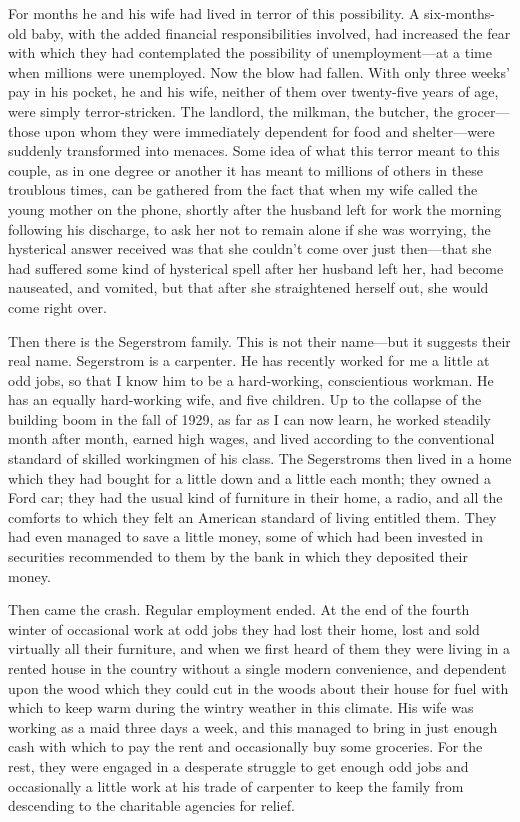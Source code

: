 \documentclass{book}
\begin{document}
For months he and his wife had lived in terror of this possibility. A six-months-old baby, with the added financial responsibilities involved, had increased the fear with which they had contemplated the possibility of unemployment—at a time when millions were unemployed. Now the blow had fallen. With only three weeks’ pay in his pocket, he and his wife, neither of them over twenty-five years of age, were simply terror-stricken. The landlord, the milkman, the butcher, the grocer—those upon whom they were immediately dependent for food and shelter—were suddenly transformed into menaces. Some idea of what this terror meant to this couple, as in one degree or another it has meant to millions of others in these troublous times, can be gathered from the fact that when my wife called the young mother on the phone, shortly after the husband left for work the morning following his discharge, to ask her not to remain alone if she was worrying, the hysterical answer received was that she couldn’t come over just then—that she had suffered some kind of hysterical spell after her husband left her, had become nauseated, and vomited, but that after she straightened herself out, she would come right over.

Then there is the Segerstrom family. This is not their name—but it suggests their real name. Segerstrom is a carpenter. He has recently worked for me a little at odd jobs, so that I know him to be a hard-working, conscientious workman. He has an equally hard-working wife, and five children. Up to the collapse of the building boom in the fall of 1929, as far as I can now learn, he worked steadily month after month, earned high wages, and lived according to the conventional standard of skilled workingmen of his class. The Segerstroms then lived in a home which they had bought for a little down and a little each month; they owned a Ford car; they had the usual kind of furniture in their home, a radio, and all the comforts to which they felt an American standard of living entitled them. They had even managed to save a little money, some of which had been invested in securities recommended to them by the bank in which they deposited their money.

Then came the crash. Regular employment ended. At the end of the fourth winter of occasional work at odd jobs they had lost their home, lost and sold virtually all their furniture, and when we first heard of them they were living in a rented house in the country without a single modern convenience, and dependent upon the wood which they could cut in the woods about their house for fuel with which to keep warm during the wintry weather in this climate. His wife was working as a maid three days a week, and this managed to bring in just enough cash with which to pay the rent and occasionally buy some groceries. For the rest, they were engaged in a desperate struggle to get enough odd jobs and occasionally a little work at his trade of carpenter to keep the family from descending to the charitable agencies for relief.
\end{document}

